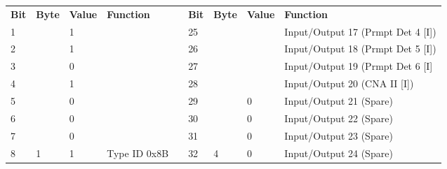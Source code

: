 \documentclass[]{article}
\begin{document}
\begin{landscape}
	\begin{table}[]
		\begin{tabular}{lllllllll}
			\cline{1-4} \cline{6-9}
			\textbf{Bit} & \textbf{Byte}       & \textbf{Value} & \textbf{Function}                       &                    & \textbf{Bit} & \textbf{Byte}       & \textbf{Value} & \textbf{Function}                               \\ \cline{1-4} \cline{6-9} 
			1            &                     & 1              &                                         &                    & 25           &                     &                & Input/Output 17 (Prmpt Det 4 {[}I{]})           \\
			2            &                     & 1              &                                         &                    & 26           &                     &                & Input/Output 18 (Prmpt Det 5 {[}I{]})           \\
			3            &                     & 0              &                                         &                    & 27           &                     &                & Input/Output 19 (Prmpt Det 6 {[}I{]}            \\
			4            &                     & 1              &                                         &                    & 28           &                     &                & Input/Output 20 (CNA II {[}I{]})                \\ \cline{8-9} 
			5            &                     & 0              &                                         &                    & 29           &                     & 0              & \cellcolor[HTML]{EFEFEF}Input/Output 21 (Spare) \\
			6            &                     & 0              &                                         &                    & 30           &                     & 0              & \cellcolor[HTML]{EFEFEF}Input/Output 22 (Spare) \\
			7            &                     & 0              &                                         &                    & 31           &                     & 0              & \cellcolor[HTML]{EFEFEF}Input/Output 23 (Spare) \\
			8            & \multirow{-8}{*}{1} & 1              & \multirow{-8}{*}{Type ID 0x8B}          & \multirow{-9}{*}{} & 32           & \multirow{-8}{*}{4} & 0              & \cellcolor[HTML]{EFEFEF}Input/Output 24 (Spare) \\ \cline{1-4} \cline{6-9} 

\end{tabular}
\end{table}
\end{landscape}
\end{document}
